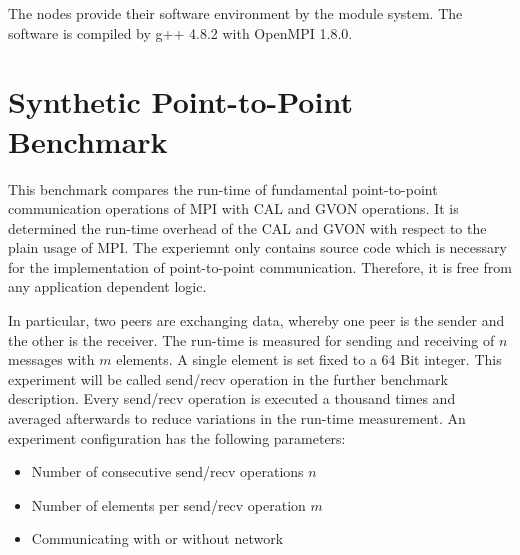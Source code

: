 

The nodes provide their software environment by the module system.
The software is compiled by g++ 4.8.2 with OpenMPI 1.8.0.

\section{Synthetic Point-to-Point Benchmark}
This benchmark compares the run-time of fundamental point-to-point
communication operations of MPI with CAL and GVON operations. It is
determined the run-time overhead of the CAL and GVON with respect to the
plain usage of MPI. The experiemnt only contains source code which is
necessary for the implementation of point-to-point
communication. Therefore, it is free from any application dependent
logic.

In particular, two peers are exchanging data, whereby one peer is the
sender and the other is the receiver. The run-time is measured for
sending and receiving of $n$ messages with $m$ elements.  A single
element is set fixed to a 64 Bit integer.  This experiment will be
called send/recv operation in the further benchmark description. Every
send/recv operation is executed a thousand times and averaged
afterwards to reduce variations in the run-time measurement. An
experiment configuration has the following parameters:

\begin{itemize}
  \item Number of consecutive send/recv operations $n$
  \item Number of elements per send/recv operation $m$
  \item Communicating with or without network
\end{itemize}

